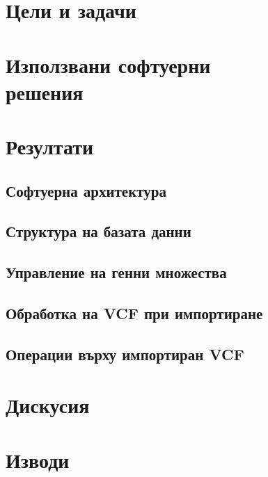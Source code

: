 \documentclass[pdftex,cyrillic,14pt,a4page,twoside]{extreport}
\begin{document}
\chapter{Цели и задачи}
\chapter[Използвани софтуерни решения]{Използвани софтуерни\\ решения}
\chapter{Резултати}
\section{Софтуерна архитектура}
\section{Структура на базата данни}
\section{Управление на генни множества}
\section{Обработка на VCF при импортиране}
\section{Операции върху импортиран VCF}
\chapter{Дискусия}
\chapter{Изводи}




\end{document}
